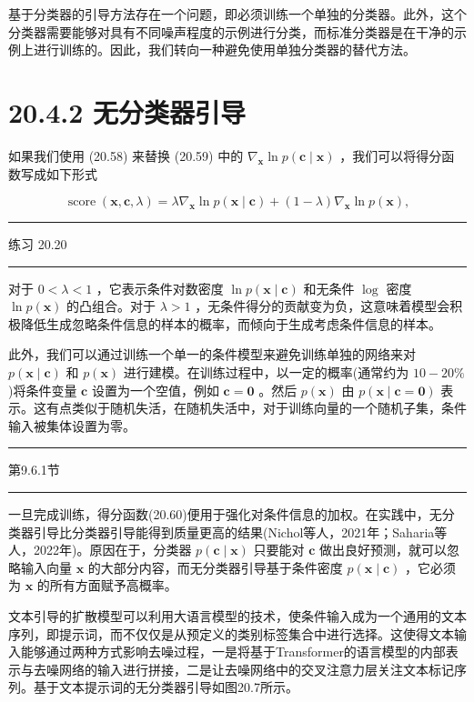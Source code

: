 \documentclass[10pt]{article}
\newcommand{\HRule}{\begin{center}\rule{0.9\linewidth}{0.2mm}\end{center}}
\begin{document}
基于分类器的引导方法存在一个问题，即必须训练一个单独的分类器。此外，这个分类器需要能够对具有不同噪声程度的示例进行分类，而标准分类器是在干净的示例上进行训练的。因此，我们转向一种避免使用单独分类器的替代方法。

\section*{20.4.2 无分类器引导}

如果我们使用 (20.58) 来替换 (20.59) 中的 \({\nabla }_{\mathbf{x}}\ln p\left( {\mathbf{c} \mid  \mathbf{x}}\right)\) ，我们可以将得分函数写成如下形式

\[
\operatorname{score}\left( {\mathbf{x},\mathbf{c},\lambda }\right)  = \lambda {\nabla }_{\mathbf{x}}\ln p\left( {\mathbf{x} \mid  \mathbf{c}}\right)  + \left( {1 - \lambda }\right) {\nabla }_{\mathbf{x}}\ln p\left( \mathbf{x}\right) , \tag{20.60}
\]

\HRule

练习 20.20

\HRule

对于 \(0 < \lambda  < 1\) ，它表示条件对数密度 \(\ln p\left( {\mathbf{x} \mid  \mathbf{c}}\right)\) 和无条件 \(\log\) 密度 \(\ln p\left( \mathbf{x}\right)\) 的凸组合。对于 \(\lambda  > 1\) ，无条件得分的贡献变为负，这意味着模型会积极降低生成忽略条件信息的样本的概率，而倾向于生成考虑条件信息的样本。

此外，我们可以通过训练一个单一的条件模型来避免训练单独的网络来对 \(p\left( {\mathbf{x} \mid  \mathbf{c}}\right)\) 和 \(p\left( \mathbf{x}\right)\) 进行建模。在训练过程中，以一定的概率(通常约为 \({10} - {20}\%\) )将条件变量 \(\mathbf{c}\) 设置为一个空值，例如 \(\mathbf{c} = \mathbf{0}\) 。然后 \(p\left( \mathbf{x}\right)\) 由 \(p\left( {\mathbf{x} \mid  \mathbf{c} = \mathbf{0}}\right)\) 表示。这有点类似于随机失活，在随机失活中，对于训练向量的一个随机子集，条件输入被集体设置为零。

\HRule

第9.6.1节

\HRule

一旦完成训练，得分函数(20.60)便用于强化对条件信息的加权。在实践中，无分类器引导比分类器引导能得到质量更高的结果(Nichol等人，2021年；Saharia等人，2022年)。原因在于，分类器 \(p\left( {\mathbf{c} \mid  \mathbf{x}}\right)\) 只要能对 \(\mathbf{c}\) 做出良好预测，就可以忽略输入向量 \(\mathbf{x}\) 的大部分内容，而无分类器引导基于条件密度 \(p\left( {\mathbf{x} \mid  \mathbf{c}}\right)\) ，它必须为 \(\mathbf{x}\) 的所有方面赋予高概率。

文本引导的扩散模型可以利用大语言模型的技术，使条件输入成为一个通用的文本序列，即提示词，而不仅仅是从预定义的类别标签集合中进行选择。这使得文本输入能够通过两种方式影响去噪过程，一是将基于Transformer的语言模型的内部表示与去噪网络的输入进行拼接，二是让去噪网络中的交叉注意力层关注文本标记序列。基于文本提示词的无分类器引导如图20.7所示。
\end{document}
